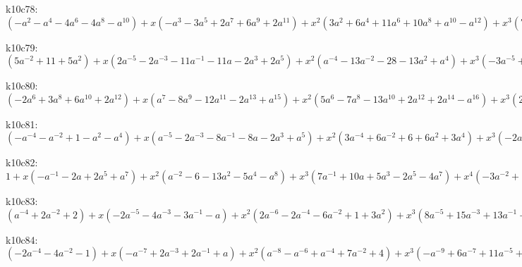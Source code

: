 k10c78: $ (-a^{2}-a^{4}-4a^{6}-4a^{8}-a^{10}) +x(-a^{3}-3a^{5}+2a^{7}+6a^{9}+2a^{11}) +x^{2}(3a^{2}+6a^{4}+11a^{6}+10a^{8}+a^{10}-a^{12}) +x^{3}(7a^{3}+15a^{5}+5a^{7}-7a^{9}-4a^{11}) +x^{4}(-3a^{2}-4a^{4}-7a^{6}-10a^{8}-3a^{10}+a^{12}) +x^{5}(-9a^{3}-21a^{5}-15a^{7}+3a^{11}) +x^{6}(a^{2}-5a^{4}-8a^{6}+2a^{8}+4a^{10}) +x^{7}(3a^{3}+6a^{5}+7a^{7}+4a^{9}) +x^{8}(3a^{4}+6a^{6}+3a^{8}) +x^{9}(a^{5}+a^{7}) $

k10c79: $ (5a^{-2}+11+5a^{2}) +x(2a^{-5}-2a^{-3}-11a^{-1}-11a-2a^{3}+2a^{5}) +x^{2}(a^{-4}-13a^{-2}-28-13a^{2}+a^{4}) +x^{3}(-3a^{-5}+4a^{-3}+22a^{-1}+22a+4a^{3}-3a^{5}) +x^{4}(-4a^{-4}+12a^{-2}+32+12a^{2}-4a^{4}) +x^{5}(a^{-5}-6a^{-3}-15a^{-1}-15a-6a^{3}+a^{5}) +x^{6}(2a^{-4}-7a^{-2}-18-7a^{2}+2a^{4}) +x^{7}(3a^{-3}+4a^{-1}+4a+3a^{3}) +x^{8}(3a^{-2}+6+3a^{2}) +x^{9}(a^{-1}+a) $

k10c80: $ (-2a^{6}+3a^{8}+6a^{10}+2a^{12}) +x(a^{7}-8a^{9}-12a^{11}-2a^{13}+a^{15}) +x^{2}(5a^{6}-7a^{8}-13a^{10}+2a^{12}+2a^{14}-a^{16}) +x^{3}(2a^{7}+22a^{9}+29a^{11}+6a^{13}-3a^{15}) +x^{4}(-4a^{6}+8a^{8}+13a^{10}-5a^{12}-5a^{14}+a^{16}) +x^{5}(-5a^{7}-23a^{9}-29a^{11}-8a^{13}+3a^{15}) +x^{6}(a^{6}-8a^{8}-15a^{10}-a^{12}+5a^{14}) +x^{7}(2a^{7}+6a^{9}+10a^{11}+6a^{13}) +x^{8}(3a^{8}+7a^{10}+4a^{12}) +x^{9}(a^{9}+a^{11}) $

k10c81: $ (-a^{-4}-a^{-2}+1-a^{2}-a^{4}) +x(a^{-5}-2a^{-3}-8a^{-1}-8a-2a^{3}+a^{5}) +x^{2}(3a^{-4}+6a^{-2}+6+6a^{2}+3a^{4}) +x^{3}(-2a^{-5}+5a^{-3}+25a^{-1}+25a+5a^{3}-2a^{5}) +x^{4}(-5a^{-4}-9a^{-2}-8-9a^{2}-5a^{4}) +x^{5}(a^{-5}-8a^{-3}-31a^{-1}-31a-8a^{3}+a^{5}) +x^{6}(3a^{-4}-6+3a^{4}) +x^{7}(5a^{-3}+13a^{-1}+13a+5a^{3}) +x^{8}(4a^{-2}+8+4a^{2}) +x^{9}(a^{-1}+a) $

k10c82: $ 1 +x(-a^{-1}-2a+2a^{5}+a^{7}) +x^{2}(a^{-2}-6-13a^{2}-5a^{4}-a^{8}) +x^{3}(7a^{-1}+10a+5a^{3}-2a^{5}-4a^{7}) +x^{4}(-3a^{-2}+14+32a^{2}+10a^{4}-4a^{6}+a^{8}) +x^{5}(-10a^{-1}-8a-4a^{3}-3a^{5}+3a^{7}) +x^{6}(a^{-2}-14-27a^{2}-8a^{4}+4a^{6}) +x^{7}(3a^{-1}-2a-a^{3}+4a^{5}) +x^{8}(4+8a^{2}+4a^{4}) +x^{9}(2a+2a^{3}) $

k10c83: $ (a^{-4}+2a^{-2}+2) +x(-2a^{-5}-4a^{-3}-3a^{-1}-a) +x^{2}(2a^{-6}-2a^{-4}-6a^{-2}+1+3a^{2}) +x^{3}(8a^{-5}+15a^{-3}+13a^{-1}+4a-2a^{3}) +x^{4}(-3a^{-6}+7a^{-4}+13a^{-2}-7-9a^{2}+a^{4}) +x^{5}(-9a^{-5}-17a^{-3}-23a^{-1}-11a+4a^{3}) +x^{6}(a^{-6}-10a^{-4}-21a^{-2}-2+8a^{2}) +x^{7}(3a^{-5}+3a^{-3}+9a^{-1}+9a) +x^{8}(4a^{-4}+10a^{-2}+6) +x^{9}(2a^{-3}+2a^{-1}) $

k10c84: $ (-2a^{-4}-4a^{-2}-1) +x(-a^{-7}+2a^{-3}+2a^{-1}+a) +x^{2}(a^{-8}-a^{-6}+a^{-4}+7a^{-2}+4) +x^{3}(-a^{-9}+6a^{-7}+11a^{-5}+4a^{-3}-2a^{-1}-2a) +x^{4}(-6a^{-8}+2a^{-6}+9a^{-4}-5a^{-2}-6) +x^{5}(a^{-9}-13a^{-7}-20a^{-5}-11a^{-3}-4a^{-1}+a) +x^{6}(4a^{-8}-8a^{-6}-17a^{-4}-2a^{-2}+3) +x^{7}(7a^{-7}+8a^{-5}+5a^{-3}+4a^{-1}) +x^{8}(6a^{-6}+10a^{-4}+4a^{-2}) +x^{9}(2a^{-5}+2a^{-3}) $


